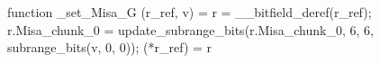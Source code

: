 function _set_Misa_G (r_ref, v) = {
    r = __bitfield_deref(r_ref);
    r.Misa_chunk_0 = update_subrange_bits(r.Misa_chunk_0, 6, 6, subrange_bits(v, 0, 0));
    (*r_ref) = r
}
